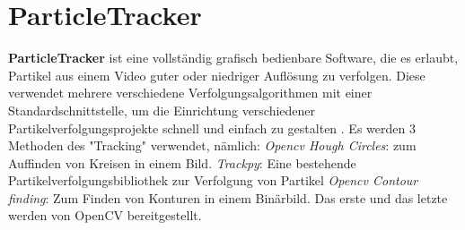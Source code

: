 
\section{ParticleTracker}
\textbf{ParticleTracker} ist eine vollständig grafisch bedienbare Software, die es erlaubt, Partikel aus einem Video guter oder niedriger Auflösung zu verfolgen. Diese verwendet mehrere verschiedene Verfolgungsalgorithmen mit einer Standardschnittstelle, um die Einrichtung verschiedener Partikelverfolgungsprojekte schnell und einfach zu gestalten \cite{Smith2021}.
Es werden 3 Methoden des "Tracking" verwendet, nämlich:
\textit{Opencv Hough Circles}: zum Auffinden von Kreisen in einem Bild.
\textit{Trackpy}: Eine bestehende Partikelverfolgungsbibliothek zur Verfolgung von Partikel 
\textit{Opencv Contour finding}: Zum Finden von Konturen in einem Binärbild.
Das erste und das letzte werden von OpenCV \cite{opencv_library} bereitgestellt.

